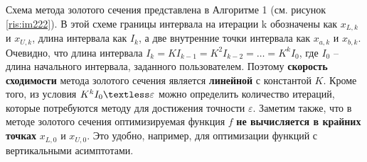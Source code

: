 Схема метода золотого сечения представлена в Алгоритме 1 (см. рисунок \ref{ris:im222}). В этой схеме границы интервала на итерации k обозначены как $x_{L,k}$ и $x_{U,k}$, длина интервала как $I_k$, а две внутренние точки интервала как $x_{a,k}$ и $x_{b,k}$.
Очевидно, что длина интервала $I_k = KI_{k-1} = K^2I_{k-2} = \dots = K^kI_0$, где $I_0$ – длина начального интервала, заданного пользователем. Поэтому \textbf{скорость сходимости} метода золотого сечения является \textbf{линейной} с константой $K$. Кроме того, из условия $ K^kI_0 \textless \varepsilon$  можно определить количество итераций, которые потребуются методу для достижения точности $\varepsilon$. Заметим также, что в методе золотого сечения оптимизируемая функция $f$ \textbf{не вычисляется в крайних точках} $x_{L,0}$ и $x_{U,0}$. Это удобно, например, для оптимизации функций с вертикальными асимптотами.

